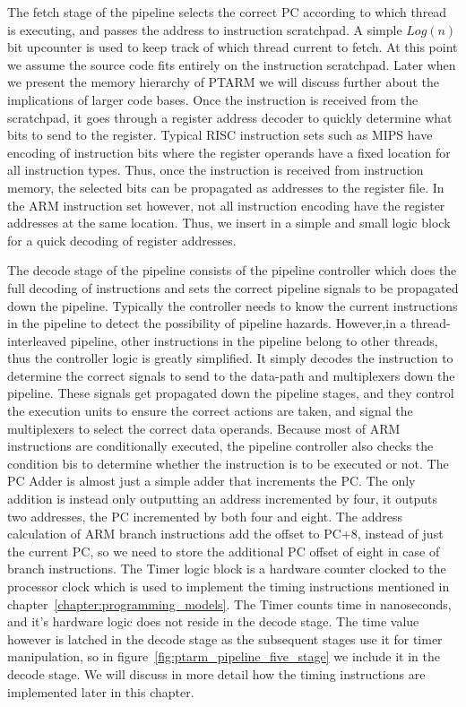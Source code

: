 The fetch stage of the pipeline selects the correct PC according to which thread is executing, and passes the address to instruction scratchpad.
A simple $Log(n)$ bit upcounter is used to keep track of which thread current to fetch.  
At this point we assume the source code fits entirely on the instruction scratchpad.
Later when we present the memory hierarchy of PTARM we will discuss further about the implications of larger code bases.
Once the instruction is received from the scratchpad, it goes through a register address decoder to quickly determine what bits to send to the register.
Typical RISC instruction sets such as MIPS have encoding of instruction bits where the register operands have a fixed location for all instruction types.
Thus, once the instruction is received from instruction memory, the selected bits can be propagated as addresses to the register file. 
In the ARM instruction set however, not all instruction encoding have the register addresses at the same location. 
Thus, we insert in a simple and small logic block for a quick decoding of register addresses.

The decode stage of the pipeline consists of the pipeline controller which does the full decoding of instructions and sets the correct pipeline signals to be propagated down the pipeline. 
Typically the controller needs to know the current instructions in the pipeline to detect the possibility of pipeline hazards.
However,in a thread-interleaved pipeline, other instructions in the pipeline belong to other threads, thus the controller logic is greatly simplified. 
It simply decodes the instruction to determine the correct signals to send to the data-path and multiplexers down the pipeline. 
These signals get propagated down the pipeline stages, and they control the execution units to ensure the correct actions are taken, and signal the multiplexers to select the correct data operands.  
Because most of ARM instructions are conditionally executed, the pipeline controller also checks the condition bis to determine whether the instruction is to be executed or not.  
The PC Adder is almost just a simple adder that increments the PC. 
The only addition is instead only outputting an address incremented by four, it outputs two addresses, the PC incremented by both four and eight. 
The address calculation of ARM branch instructions add the offset to PC+8, instead of just the current PC, so we need to store the additional PC offset of eight in case of branch instructions.
The Timer logic block is a hardware counter clocked to the processor clock which is used to implement the timing instructions mentioned in chapter~\ref{chapter:programming_models}.
The Timer counts time in nanoseconds, and it's hardware logic does not reside in the decode stage. 
The time value however is latched in the decode stage as the subsequent stages use it for timer manipulation, so in figure~\ref{fig:ptarm_pipeline_five_stage} we include it in the decode stage.
We will discuss in more detail how the timing instructions are implemented later in this chapter. 

